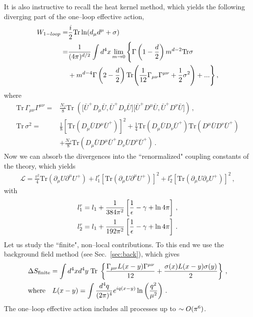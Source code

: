 \documentclass[11pt,a4paper]{article}
\newcommand{\be}{\begin{equation}}
\newcommand{\ee}{\end{equation}}
\newcommand\m{\mu}
\newcommand\G{\Gamma}
\newcommand\n{\nu}
\newcommand\s{\sigma}
\def\d{\partial}
\renewcommand{\ln}{\mathop{\rm ln}\nolimits}
\begin{document}
It is also instructive to recall the heat kernel method, which yields the following diverging part of the
one--loop effective action,
\be
\begin{split}
W_{1-loop}=&\frac{i}{2}\text{Tr}\ln(d_\m d^\m+\sigma)\\
=&\frac{1}{(4\pi)^{d/2}}\int d^4x \lim_{m\to 0}\Bigg\{
\Gamma\left(1-\frac{d}{2}\right)m^{d-2}\text{Tr}\sigma\\
&+
m^{d-4}\Gamma\left(2-\frac{d}{2}\right)\text{Tr}\Bigg(\frac{1}{12}\G_{\m\n}\G^{\m\n}+\frac{1}{2}\sigma^2\Bigg)+...
\Bigg\}\,,
\end{split}
\ee
where
\be
\begin{split}
\text{Tr}\,\G_{\m\n}\G^{\m\n}=&\frac{N_f}{8}\text{Tr}\;\left(
\Bigg[\bar U^+D_\m \bar U,\bar U^+ D_\n \bar U\Bigg]
\Bigg[\bar U^+D^\m \bar U,\bar U^+ D^\n \bar U\Bigg]
\right)\,,\\
\text{Tr}\,\s^2 =&\frac{1}{8}\left[\text{Tr}\left(D_\m\bar U D^\m \bar U^+\right)\right]^2
+\frac{1}{4}\text{Tr}\left(D_\m \bar U D_\n \bar U^+\right)
\text{Tr}\left(D^\m \bar U D^\n \bar U^+\right)\\
&+\frac{N_f}{8}\text{Tr}(D_\m\bar U D^\m \bar U^+ D_\n \bar U D^\n \bar U^+)\,.
\end{split}
\ee
Now we can absorb the divergences into the ``renormalized" coupling constants of the theory,
which yields
\be
\begin{split}
\mathcal{L}=\frac{v^2}{4}\text{Tr}\left(\d_\m U \d^\m U^+\right)
+l^r_1[\text{Tr}\left(\d_\m U \d^\m U^+\right)]^2+l^r_2[\text{Tr}\left(\d_\m U \d_\n U^+\right)]^2\,,
\end{split}
\ee
with
\be
\begin{split}
& l_1^r=l_1+\frac{1}{384\pi^2}\left[\frac{1}{\epsilon}-\gamma+\ln 4\pi\right]\,,\\
& l_2^r=l_1+\frac{1}{192\pi^2}\left[\frac{1}{\epsilon}-\gamma+\ln 4\pi\right]\,.
\end{split}
\ee
Let us study the ``finite", non--local contributions.
To this end we use the background field method (see Sec.~\ref{sec:back}), which gives
\be
\begin{split}
&\Delta S_{\text{finite}}=\int d^4xd^4y \;\text{Tr}\;\left\{\frac{\G_{\m\n}L(x-y)\G^{\m\n}}{12}
+\frac{\s(x) L(x-y)\s(y)}{2}
\right\}\,,\\
&\text{where} \quad L(x-y)=\int \frac{d^4q}{(2\pi)^4}e^{iq(x-y)}\ln \left(\frac{q^2}{\mu^2}\right)\,.
\end{split}
\ee
The one--loop effective action includes all processes up to $\sim O({\bf \pi}^6)$.
\end{document}
